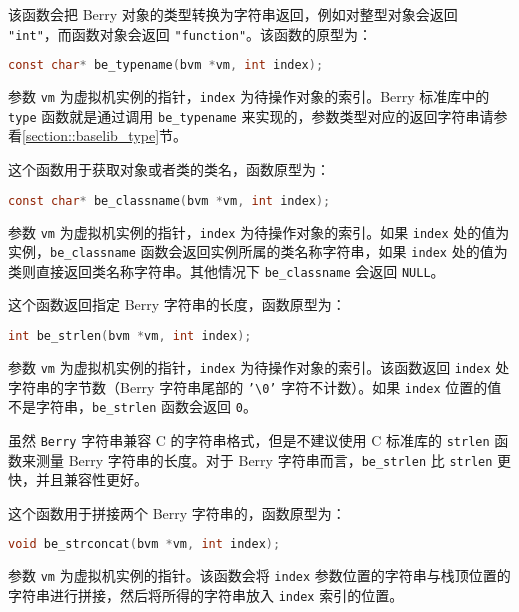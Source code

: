 
该函数会把 Berry 对象的类型转换为字符串返回，例如对整型对象会返回 \texttt{"int"}，而函数对象会返回 \texttt{"function"}。该函数的原型为：
\begin{lstlisting}[language=c, style=berry, numbers=none]
const char* be_typename(bvm *vm, int index);
\end{lstlisting}
参数 \texttt{vm} 为虚拟机实例的指针，\texttt{index} 为待操作对象的索引。Berry 标准库中的 \texttt{type} 函数就是通过调用 \texttt{be\_typename} 来实现的，参数类型对应的返回字符串请参看\ref{section::baselib_type}节。


这个函数用于获取对象或者类的类名，函数原型为：
\begin{lstlisting}[language=c, style=berry, numbers=none]
const char* be_classname(bvm *vm, int index);
\end{lstlisting}
参数 \texttt{vm} 为虚拟机实例的指针，\texttt{index} 为待操作对象的索引。如果 \texttt{index} 处的值为实例，\texttt{be\_classname} 函数会返回实例所属的类名称字符串，如果 \texttt{index} 处的值为类则直接返回类名称字符串。其他情况下 \texttt{be\_classname} 会返回 \texttt{NULL}。


这个函数返回指定 Berry 字符串的长度，函数原型为：
\begin{lstlisting}[language=c, style=berry, numbers=none]
int be_strlen(bvm *vm, int index);
\end{lstlisting}
参数 \texttt{vm} 为虚拟机实例的指针，\texttt{index} 为待操作对象的索引。该函数返回 \texttt{index} 处字符串的字节数（Berry 字符串尾部的 \texttt{'\textbackslash 0'} 字符不计数）。如果 \texttt{index} 位置的值不是字符串，\texttt{be\_strlen} 函数会返回 \texttt{0}。

虽然 \texttt{Berry} 字符串兼容 C 的字符串格式，但是不建议使用 C 标准库的 \texttt{strlen} 函数来测量 Berry 字符串的长度。对于 Berry 字符串而言，\texttt{be\_strlen} 比 \texttt{strlen} 更快，并且兼容性更好。


这个函数用于拼接两个 Berry 字符串的，函数原型为：
\begin{lstlisting}[language=c, style=berry, numbers=none]
void be_strconcat(bvm *vm, int index);
\end{lstlisting}
参数 \texttt{vm} 为虚拟机实例的指针。该函数会将 \texttt{index} 参数位置的字符串与栈顶位置的字符串进行拼接，然后将所得的字符串放入 \texttt{index} 索引的位置。

